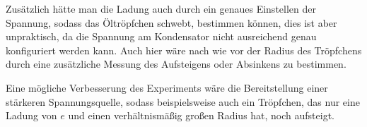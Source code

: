 \documentclass[
	a4paper,
	12pt,
	pagesize,
	ngerman
]{scrartcl}
\begin{document}
	Zusätzlich hätte man die Ladung auch durch ein genaues Einstellen der Spannung, sodass das Öltröpfchen schwebt, bestimmen können, dies ist aber unpraktisch, da die Spannung am Kondensator nicht ausreichend genau konfiguriert werden kann.
	Auch hier wäre nach wie vor der Radius des Tröpfchens durch eine zusätzliche Messung des Aufsteigens oder Absinkens zu bestimmen.


	Eine mögliche Verbesserung des Experiments wäre die Bereitstellung einer stärkeren Spannungsquelle, sodass beispielsweise auch ein Tröpfchen, das nur eine Ladung von $e$ und einen verhältnismäßig großen Radius hat, noch aufsteigt.

	

	\printbibliography
\end{document}
